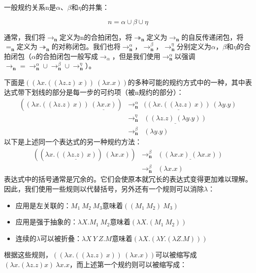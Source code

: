 \documentclass{book}
\begin{document}
一般规约关系n是$\alpha$、$\beta$和$\eta$的并集：
\begin{framed}
$$
n=\alpha\cup\beta\cup\eta
$$
\end{framed}
通常，我们将$\rightarrow_\textbf{n}$定义为n的合拍闭包，将$\twoheadrightarrow_\textbf{n}$定义为$\rightarrow_\textbf{n}$的自反传递闭包，将$=_\textbf{n}$定义为$\twoheadrightarrow_\textbf{n}$的对称闭包。我们也将$\rightarrow_\textbf{n}^\alpha$，$\rightarrow_\textbf{n}^\beta$，$\rightarrow_\textbf{n}^\eta$分别定义为$\alpha$，$\beta$和$\eta$的合拍闭包（$\alpha$的合拍闭包一般写成$\rightarrow_\alpha$，但是我们使用$\rightarrow_\textbf{n}^\alpha$以强调$\rightarrow_\textbf{n}=\rightarrow_\textbf{n}^\alpha\cup\rightarrow_\textbf{n}^\beta\cup\rightarrow_\textbf{n}^\eta$）。\par
下面是$((\lambda x.((\lambda z.z)\ x))\ (\lambda x.x))$的多种可能的规约方式中的一种，其中表达式带下划线的部分是每一步的可约项（被n规约的部分）：
$$
\begin{array}{lll}
((\lambda x.((\lambda z.z)\ x))\ \underline{(\lambda x.x)}) & \rightarrow_\textbf{n}^\alpha & (\underline{(\lambda x.((\lambda z.z)\ x))}\ (\lambda y.y) \\
& \rightarrow_\textbf{n}^\eta & \underline{((\lambda z.z)\ (\lambda y.y))} \\
& \rightarrow_\textbf{n}^\beta & (\lambda y.y)
\end{array}
$$
以下是上述同一个表达式的另一种规约方法：
$$
\begin{array}{lll}
((\lambda x.\underline{((\lambda z.z)\ x)})\ (\lambda x.x)) & \rightarrow_\textbf{n}^\beta & \underline{((\lambda x.x)\ (\lambda x.x))} \\
& \rightarrow_\textbf{n}^\beta & (\lambda x.x)
\end{array}
$$
表达式中的括号通常是冗余的。它们会使原本就冗长的表达式变得更加难以理解。因此，我们使用一些规则以代替括号，另外还有一个规则可以消除$\lambda$：
\begin{itemize}
  \item 应用是左关联的：$M_1\ M_2\ M_3$意味着$((M_1\ M_2)\ M_3)$\\
  \item 应用是强于抽象的：$\lambda X.M_1\ M_2$意味着$(\lambda X.(M_1\ M_2))$\\
  \item 连续的$\lambda$可以被折叠：$\lambda X\ Y\ Z.M$意味着$(\lambda X.(\lambda Y.(\lambda Z.M)))$\\
\end{itemize}
根据这些规则，$((\lambda x.((\lambda z.z)\ x))\ (\lambda x.x))$可以被缩写成$(\lambda x.(\lambda z.z) x)\ \lambda x.x$，而上述第一个规约则可以被缩写成：
\end{document}
